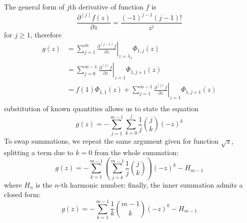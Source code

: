 The general form of $j$th derivative of function $f$ is 
$$\frac{\partial^{(j)}{f}(z)}{\partial{z}} =\frac{(-1)^{j-1}(j-1)!}{z^{j}}  $$ 
for $j \geq 1$, therefore
\begin{displaymath}
\begin{split}
  g(z) &= \sum_{j=1}^{m}{ \left. \frac{\partial^{(j-1)}{f}}{\partial{z}} \right|_{z=\lambda_{1}}\Phi_{1,j}(z)} \\
       &= \sum_{j=0}^{m-1}{ \left. \frac{\partial^{(j)}{f}}{\partial{z}} \right|_{z=1}\Phi_{1,j+1}(z)} \\
       &= f(1)\Phi_{1,1}(z) + \sum_{j=1}^{m-1}{ \left. \frac{\partial^{(j)}{f}}{\partial{z}} \right|_{z=1}\Phi_{1,j+1}(z)} \\
\end{split}
\end{displaymath}
substitution of known quantities allows us to state the equation
\begin{equation}
  g(z) = - \sum_{j=1}^{m-1}{\sum_{k=0}^{j}{\frac{1}{j}{{j}\choose{k}}(-z)^{k}}}
\end{equation}
To swap summations, we repeat the same argument given for function $\sqrt{z}$, splitting
a term due to $k=0$ from the whole summation:
\begin{equation}
  g(z) = - \sum_{k=1}^{m-1}{\left(\sum_{j=k}^{m-1}{\frac{1}{j}{{j}\choose{k}}}\right)}(-z)^{k} - H_{m-1} 
\end{equation}
where $H_{n}$ is the $n$-th harmonic number; finally, the inner summation admits
a closed form:
\begin{equation}
  g(z) = - \sum_{k=1}^{m-1}\frac{1}{k}{{m-1}\choose{k}}{(-z)^{k}}- H_{m-1} 
\end{equation}

